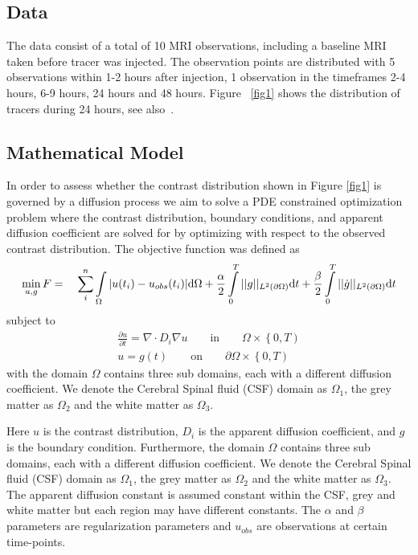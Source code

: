 \documentclass[11pt,a4paper]{article}
\begin{document}
\subsection*{Data}
The data consist of a total of 10 MRI observations, including a baseline MRI taken before tracer was injected. The observation points are distributed with 5 observations within 1-2 hours after injection, 1 observation in the timeframes 2-4 hours, 6-9 hours, 24 hours and 48 hours. Figure ~\ref{fig1} shows the distribution of tracers during 24 hours, see also~\cite{ringstad2017glymphatic}.   



\subsection*{Mathematical Model}
In order to assess whether the contrast distribution shown 
in Figure \ref{fig1} is governed by a diffusion process we
aim to solve a PDE constrained optimization problem where
the contrast distribution, boundary conditions, and apparent
diffusion coefficient are solved for by optimizing with
respect to the observed contrast distribution. 
The objective function was defined as 
\begin{equation}
\min_{u,g} F = \quad \sum\limits_i\sp{n} \int\limits_{\Omega} |u(t_i) - u_{obs}(t_i)| \mathrm{d}\Omega + \frac{\alpha}{2} \int\limits_{0}\sp{T} || g ||_{L\sp{2}(\partial\Omega)} \mathrm{d}t + \frac{\beta}{2} \int\limits_{0}\sp{T} || \dot{g} ||_{L\sp{2}(\partial\Omega)}\mathrm{d}t 
\label{EQ::objf}
\end{equation}
subject to   
\begin{equation}
\begin{aligned}
\frac{\partial u}{\partial t} = \nabla \cdot  D_i \nabla u \qquad \text{in} \qquad \Omega \times \left\lbrace 0 , T \right)  \\
u=g(t) \qquad \text{on} \qquad \partial\Omega  \times \left\lbrace 0 , T \right) 
\end{aligned}
\label{Eq::PDE}
\end{equation}
with the domain $\Omega$ contains three sub domains, each with a different diffusion coefficient. We denote the Cerebral Spinal fluid (CSF) domain as $\Omega_1$, the grey matter as $\Omega_2$ and the white matter as $\Omega_3$.

Here $u$ is the contrast distribution, $D_i$ is the apparent diffusion 
coefficient, and $g$ is the boundary condition. Furthermore,  
the domain $\Omega$ contains three sub domains, each with a different diffusion coefficient. We denote the Cerebral Spinal fluid (CSF) domain as $\Omega_1$, the grey matter as $\Omega_2$ and the white matter as $\Omega_3$. The apparent
diffusion constant is assumed constant within the CSF, grey and 
white matter but each region may have different constants.  
The $\alpha$ and $\beta$ parameters are regularization parameters 
and $u_{obs}$ are observations at certain time-points. 
\end{document}
